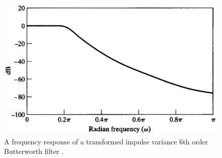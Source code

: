 \begin{figure}[H]
	\centering
	\includegraphics[scale=0.2]{figures/BilinearFrequencyResponse.pdf}
	\caption{A frequency response of a transformed impulse variance 6th order Butterworth filter \cite{AVOppenheim}.}
	\label{fig:ImpulseVariantFrequencyResponse}
\end{figure}

